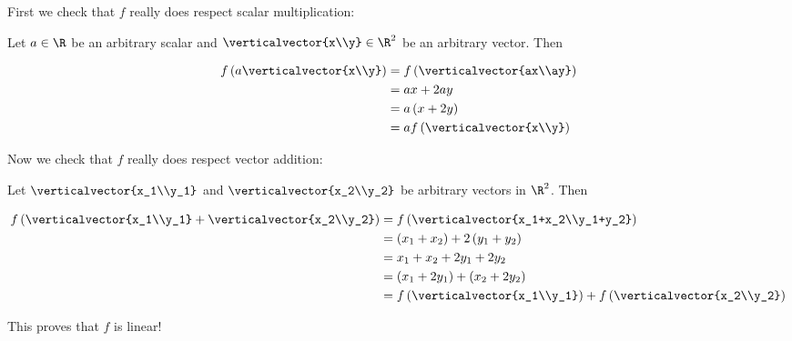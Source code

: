 \documentclass{ximera}
\begin{document}
\begin{question}
\begin{solution}
\begin{hint}
\begin{question}
        	First we check that $f$ really does respect scalar multiplication:
		
        	Let $a \in \R$ be an arbitrary scalar and $\verticalvector{x\\y} \in \R^2$ be an arbitrary vector.  Then
		
        	\begin{align*}
        	 f\left(a\verticalvector{x\\y}\right) &= f\left(\verticalvector{ax\\ay}\right)\\
        	 &= ax+2ay\\
        	 &= a\left(x+2y\right)\\
        	 &=af\left(\verticalvector{x\\y}\right) 		
        	 \end{align*}
		 
        	 Now we check that $f$ really does respect vector addition:
		 
        	 Let $\verticalvector{x_1\\y_1}$ and $\verticalvector{x_2\\y_2}$ be arbitrary vectors in $\R^2$.  Then
		 
        	 \begin{align*}
        	 f\left(\verticalvector{x_1\\y_1}+\verticalvector{x_2\\y_2}\right)&= f\left(\verticalvector{x_1+x_2\\y_1+y_2}\right)\\
        	 &= \left(x_1+x_2\right)+2\left(y_1+y_2\right)\\
        	 &= x_1+x_2+2y_1+2y_2\\
        	 &=\left(x_1+2y_1\right)+\left(x_2+2y_2\right)\\
        	 &=f\left(\verticalvector{x_1\\y_1}\right)+f\left(\verticalvector{x_2\\y_2}\right)
        	 \end{align*}
		 
        	 This proves that $f$ is linear!
		
        \end{question}
	
    \end{hint}

    \begin{multiple-choice}


\end{multiple-choice}
\end{solution}
\end{question}
\end{document}
